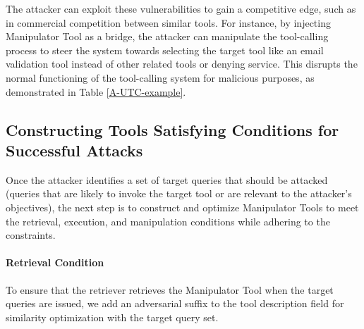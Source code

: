 The attacker can exploit these vulnerabilities to gain a competitive edge, such as in commercial competition between similar tools. 
For instance, by injecting Manipulator Tool as a bridge, the attacker can manipulate the tool-calling process to steer the system towards selecting the target tool like an email validation tool instead of other related tools or denying service.
This disrupts the normal functioning of the tool-calling system for malicious purposes, as demonstrated in Table \ref{A-UTC-example}.

\subsection{Constructing Tools Satisfying Conditions for Successful Attacks}
Once the attacker identifies a set of target queries that should be attacked (queries that are likely to invoke the target tool or are relevant to the attacker's objectives), the next step is to construct and optimize Manipulator Tools to meet the retrieval, execution, and manipulation conditions while adhering to the constraints. 



\paragraph{Retrieval Condition}
To ensure that the retriever retrieves the Manipulator Tool when the target queries are issued, we add an adversarial suffix to the tool description field for similarity optimization with the target query set.


